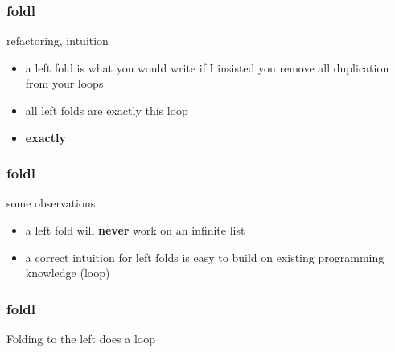 \begin{frame}
\frametitle{foldl}
\begin{block}{refactoring, intuition}
\begin{itemize}
\item<1-> a left fold is what you would write if I insisted you remove all duplication from your loops
\item<2-> all left folds are exactly this loop
\item<3-> \textbf{exactly}
\end{itemize}
\end{block}
\end{frame}

\begin{frame}
\frametitle{foldl}
\begin{block}{some observations}
\begin{itemize}
\item<1-> a left fold will \textbf{never} work on an infinite list
\item<2-> a correct intuition for left folds is easy to build on existing programming knowledge (loop)
\end{itemize}
\end{block}
\end{frame}

\begin{frame}
\frametitle{foldl}
\begin{center}
Folding to the left does a loop
\end{center}
\end{frame}

